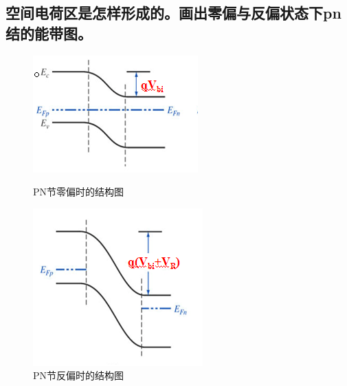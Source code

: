 \documentclass[UTF8]{ctexart}   %
\begin{document}

\clearpage                      %

\subsection{空间电荷区是怎样形成的。画出零偏与反偏状态下pn结的能带图。}

\begin{figure}[ht]
    \centering
    \includegraphics{PN0.png}
    \caption{PN节零偏时的结构图}
    \includegraphics{PN1.png}
    \caption{PN节反偏时的结构图}
\end{figure}

\end{document}
